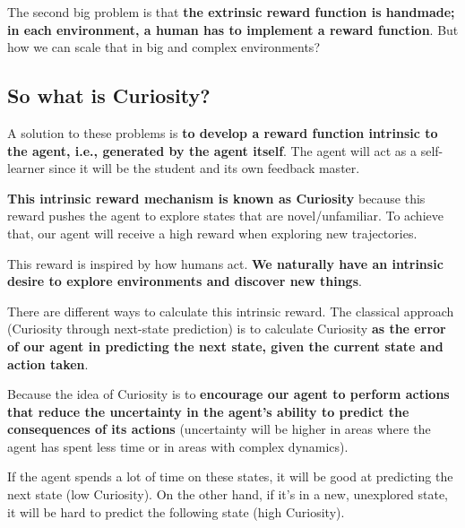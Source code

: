 \documentclass[11pt,a4paper]{article}
\begin{document}

The second big problem is that \textbf{the extrinsic reward function is handmade; in each environment, a human has to implement a reward function}. But how we can scale that in big and complex environments?

\subsection{So what is Curiosity?}\label{so-what-is-curiosity}

A solution to these problems is \textbf{to develop a reward function intrinsic to the agent, i.e., generated by the agent itself}. The agent will act as a self-learner since it will be the student and its own feedback master.

\textbf{This intrinsic reward mechanism is known as Curiosity} because this reward pushes the agent to explore states that are novel/unfamiliar. To achieve that, our agent will receive a high reward when exploring new trajectories.

This reward is inspired by how humans act. \textbf{We naturally have an intrinsic desire to explore environments and discover new things}.

There are different ways to calculate this intrinsic reward. The classical approach (Curiosity through next-state prediction) is to calculate Curiosity \textbf{as the error of our agent in predicting the next state, given the current state and action taken}.


Because the idea of Curiosity is to \textbf{encourage our agent to perform actions that reduce the uncertainty in the agent's ability to predict the consequences of its actions} (uncertainty will be higher in areas where the agent has spent less time or in areas with complex dynamics).

If the agent spends a lot of time on these states, it will be good at predicting the next state (low Curiosity). On the other hand, if it's in a new, unexplored state, it will be hard to predict the following state (high Curiosity).
\end{document}
